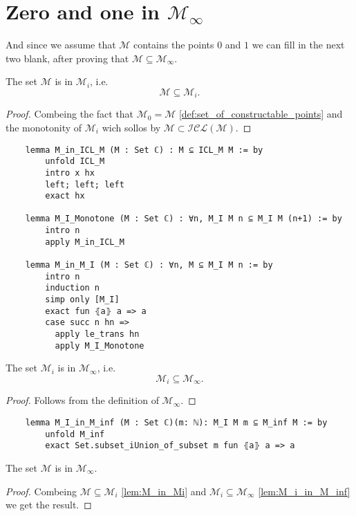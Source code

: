 \section{Zero and one in $\mathcal{M}_{\infty}$}
And since we assume that $\mathcal{M}$ contains the points $0$ and $1$ we can fill in the next two blank, 
after proving that $\mathcal{M} \subseteq \mathcal{M}_{\infty}$.

\begin{lemma}
    \label{lem:M_in_Mi}
    The set $\mathcal{M}$ is in $\mathcal{M}_i$, i.e. $$\mathcal{M} \subseteq \mathcal{M}_i.$$
\end{lemma}
\begin{proof}
    Combeing the fact that $\mathcal{M}_0 = \mathcal{M}$ \ref{def:set_of_constructable_points} and the monotonity of $\mathcal{M}_i$ wich sollos by $\mathcal{M} \subset \mathcal{ICL(M)}$.
\end{proof}

\begin{lstlisting}
    lemma M_in_ICL_M (M : Set ℂ) : M ⊆ ICL_M M := by
        unfold ICL_M
        intro x hx 
        left; left; left
        exact hx

    lemma M_I_Monotone (M : Set ℂ) : ∀n, M_I M n ⊆ M_I M (n+1) := by
        intro n
        apply M_in_ICL_M

    lemma M_in_M_I (M : Set ℂ) : ∀n, M ⊆ M_I M n := by
        intro n
        induction n
        simp only [M_I]
        exact fun ⦃a⦄ a => a
        case succ n hn =>
          apply le_trans hn
          apply M_I_Monotone
\end{lstlisting}

\begin{lemma}

    The set $\mathcal{M}_i$ is in $\mathcal{M}_{\infty}$, i.e. $$\mathcal{M}_i \subseteq \mathcal{M}_{\infty}.$$
\end{lemma}
\begin{proof}
    Follows from the definition of $\mathcal{M}_{\infty}$.
\end{proof}

\begin{lstlisting}
    lemma M_I_in_M_inf (M : Set ℂ)(m: ℕ): M_I M m ⊆ M_inf M := by
        unfold M_inf
        exact Set.subset_iUnion_of_subset m fun ⦃a⦄ a => a
\end{lstlisting}

\begin{lemma}

    The set $\mathcal{M}$ is in $\mathcal{M}_{\infty}$.
\end{lemma}
\begin{proof}
    Combeing $\mathcal{M} \subseteq \mathcal{M}_i$ \ref{lem:M_in_Mi} and $\mathcal{M}_i \subseteq \mathcal{M}_{\infty}$ \ref{lem:M_i_in_M_inf} we get the result.
\end{proof}

